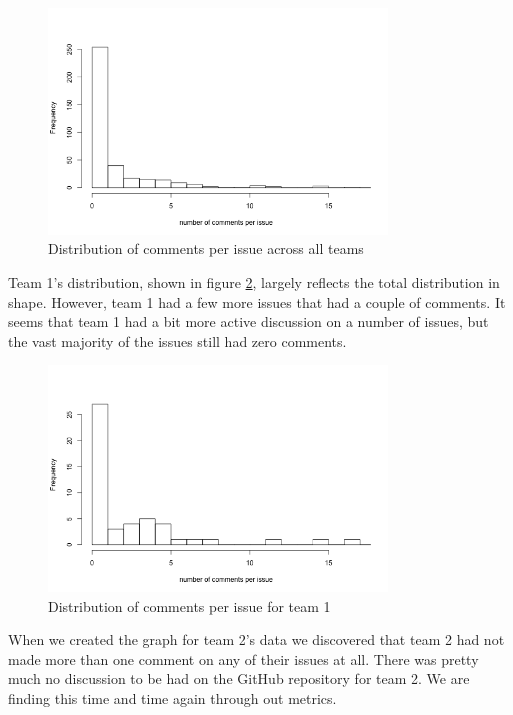 \documentclass[conference]{IEEEtran}
\begin{document}
\begin{figure}[H]
    \centering
    \includegraphics[width=9cm]{../AprilProject/pic/distribution/comment_per_issue_distribution_total.png}
    \caption{Distribution of comments per issue across all teams}
    \label{comments_issue_total}
\end{figure}

Team 1's distribution, shown in figure \ref{comments_issue_team1}, largely reflects the total distribution in shape. However, team 1 had a few more issues that had a couple of comments. It seems that team 1 had a bit more active discussion on a number of issues, but the vast majority of the issues still had zero comments.

\begin{figure}[H]
    \centering
    \includegraphics[width=9cm]{../AprilProject/pic/distribution/comment_per_issue_distribution_team1.png}
    \caption{Distribution of comments per issue for team 1}
    \label{comments_issue_team1}
\end{figure}

When we created the graph for team 2's data we discovered that team 2 had not made more than one comment on any of their issues at all. There was pretty much no discussion to be had on the GitHub repository for team 2. We are finding this time and time again through out metrics. 
\end{document}
